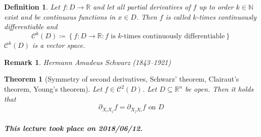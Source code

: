 \documentclass{article}
\newtheorem{theorem}{Theorem}  \numberwithin{theorem}{section}
\newtheorem{definition}{Definition}  \numberwithin{definition}{section}
\newtheorem{remark}{Remark}  \numberwithin{remark}{section}
\newcommand{\set}[1]{\left\{#1\right\}}
\newcommand{\dateref}[1]{\paragraph{\textit{This lecture took place on #1.}}}
\begin{document}
\begin{definition}
  Let $f: D \to \mathbb R$ and let all partial derivatives of $f$ up to order $k \in \mathbb N$ exist and be continuous functions in $x \in D$.
  Then $f$ is called \emph{$k$-times continuously differentiable} and
  \[ \mathcal C^k(D) \coloneqq \set{f: D \to \mathbb R: f \text{ is $k$-times continuously differentiable}} \]
  $\mathcal C^k(D)$ is a vector space.
\end{definition}

\begin{remark}
  Hermann Amadeus Schwarz (1843--1921)
\end{remark}

\begin{theorem}[Symmetry of second derivatives, Schwarz' theorem, Clairaut's theorem, Young's theorem] %
  Let $f \in \mathcal C^2(D)$. Let $D \subseteq \mathbb R^n$ be open. Then it holds that
  \[ \partial_{X_i X_j} f = \partial_{X_j X_i} f \text{ on } D \]
\end{theorem}

\dateref{2018/06/12}
\end{document}
